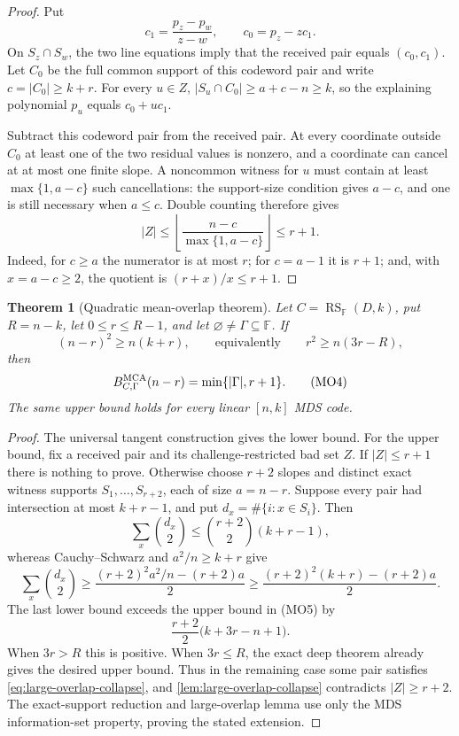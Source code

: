\documentclass[11pt,a4paper]{amsart}
\numberwithin{equation}{section}
\newtheorem{theorem}{Theorem}[section]
\theoremstyle{remark}
\DeclareMathOperator{\RS}{RS}
\newcommand{\F}{\mathbb F}
\newcommand{\abs}[1]{\lvert #1\rvert}
\newcommand{\floor}[1]{\left\lfloor #1\right\rfloor}
\begin{document}
\begin{proof}
Put
\[
 c_1=\frac{p_z-p_w}{z-w},\qquad c_0=p_z-zc_1.
\]
On \(S_z\cap S_w\), the two line equations imply that the received pair
equals \((c_0,c_1)\).  Let \(C_0\) be the full common support of this
codeword pair and write \(c=\abs{C_0}\ge k+r\).  For every \(u\in Z\),
\(\abs{S_u\cap C_0}\ge a+c-n\ge k\), so the explaining polynomial
\(p_u\) equals \(c_0+uc_1\).

Subtract this codeword pair from the received pair.  At every coordinate
outside \(C_0\) at least one of the two residual values is nonzero, and a
coordinate can cancel at at most one finite slope.  A noncommon witness
for \(u\) must contain at least \(\max\{1,a-c\}\) such cancellations:
the support-size condition gives \(a-c\), and one is still necessary when
\(a\le c\).  Double counting therefore gives
\[
 \abs Z\le
 \floor{\frac{n-c}{\max\{1,a-c\}}}\le r+1.        \tag{MO2}
\label{eq:large-overlap-count}
\]
Indeed, for \(c\ge a\) the numerator is at most \(r\); for \(c=a-1\)
it is \(r+1\); and, with \(x=a-c\ge2\), the quotient is
\((r+x)/x\le r+1\).
\end{proof}

\begin{theorem}[Quadratic mean-overlap theorem]
\label{thm:quadratic-mean-overlap}
Let \(C=\RS_\F(D,k)\), put \(R=n-k\), let
\(0\le r\le R-1\), and let \(\varnothing\ne\Gamma\subseteq\F\).  If
\[
 (n-r)^2\ge n(k+r),
 \qquad\text{equivalently}\qquad
 r^2\ge n(3r-R),                                  \tag{MO3}
\label{eq:quadratic-overlap-condition}
\]
then
\[
 B_{C,\Gamma}^{\rm MCA}(n-r)=\min\{\abs\Gamma,r+1\}. \tag{MO4}
\label{eq:quadratic-overlap-exact}
\]
The same upper bound holds for every linear \([n,k]\) MDS code.
\end{theorem}

\begin{proof}
The universal tangent construction gives the lower bound.  For the upper
bound, fix a received pair and its challenge-restricted bad set \(Z\).
If \(\abs Z\le r+1\) there is nothing to prove.  Otherwise choose
\(r+2\) slopes and distinct exact witness supports
\(S_1,\ldots,S_{r+2}\), each of size \(a=n-r\).  Suppose every pair had
intersection at most \(k+r-1\), and put
\(d_x=\#\{i:x\in S_i\}\).  Then
\[
 \sum_x\binom{d_x}{2}\le\binom{r+2}{2}(k+r-1),    \tag{MO5}
\]
whereas Cauchy--Schwarz and \(a^2/n\ge k+r\) give
\[
 \sum_x\binom{d_x}{2}
 \ge\frac{(r+2)^2a^2/n-(r+2)a}{2}
 \ge\frac{(r+2)^2(k+r)-(r+2)a}{2}.                \tag{MO6}
\]
The last lower bound exceeds the upper bound in \textup{(MO5)} by
\[
 \frac{r+2}{2}\bigl(k+3r-n+1\bigr).
\]
When \(3r>R\) this is positive.  When \(3r\le R\), the exact deep theorem
already gives the desired upper bound.  Thus in the remaining case some
pair satisfies \eqref{eq:large-overlap-collapse}, and
\cref{lem:large-overlap-collapse} contradicts \(\abs Z\ge r+2\).
The exact-support reduction and large-overlap lemma use only the MDS
information-set property, proving the stated extension.
\end{proof}
\end{document}
